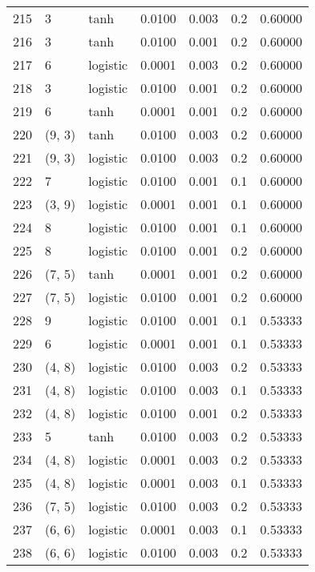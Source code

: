 \begin{tabular}{lllrrrr}
215 &           3 &      tanh &  0.0100 &  0.003 &  0.2 &   0.60000 \\
216 &           3 &      tanh &  0.0100 &  0.001 &  0.2 &   0.60000 \\
217 &           6 &  logistic &  0.0001 &  0.003 &  0.2 &   0.60000 \\
218 &           3 &  logistic &  0.0100 &  0.001 &  0.2 &   0.60000 \\
219 &           6 &      tanh &  0.0001 &  0.001 &  0.2 &   0.60000 \\
220 &      (9, 3) &      tanh &  0.0100 &  0.003 &  0.2 &   0.60000 \\
221 &      (9, 3) &  logistic &  0.0100 &  0.003 &  0.2 &   0.60000 \\
222 &           7 &  logistic &  0.0100 &  0.001 &  0.1 &   0.60000 \\
223 &      (3, 9) &  logistic &  0.0001 &  0.001 &  0.1 &   0.60000 \\
224 &           8 &  logistic &  0.0100 &  0.001 &  0.1 &   0.60000 \\
225 &           8 &  logistic &  0.0100 &  0.001 &  0.2 &   0.60000 \\
226 &      (7, 5) &      tanh &  0.0001 &  0.001 &  0.2 &   0.60000 \\
227 &      (7, 5) &  logistic &  0.0100 &  0.001 &  0.2 &   0.60000 \\
228 &           9 &  logistic &  0.0100 &  0.001 &  0.1 &   0.53333 \\
229 &           6 &  logistic &  0.0001 &  0.001 &  0.1 &   0.53333 \\
230 &      (4, 8) &  logistic &  0.0100 &  0.003 &  0.2 &   0.53333 \\
231 &      (4, 8) &  logistic &  0.0100 &  0.003 &  0.1 &   0.53333 \\
232 &      (4, 8) &  logistic &  0.0100 &  0.001 &  0.2 &   0.53333 \\
233 &           5 &      tanh &  0.0100 &  0.003 &  0.2 &   0.53333 \\
234 &      (4, 8) &  logistic &  0.0001 &  0.003 &  0.2 &   0.53333 \\
235 &      (4, 8) &  logistic &  0.0001 &  0.003 &  0.1 &   0.53333 \\
236 &      (7, 5) &  logistic &  0.0100 &  0.003 &  0.2 &   0.53333 \\
237 &      (6, 6) &  logistic &  0.0001 &  0.003 &  0.1 &   0.53333 \\
238 &      (6, 6) &  logistic &  0.0100 &  0.003 &  0.2 &   0.53333 \\

\end{tabular}
